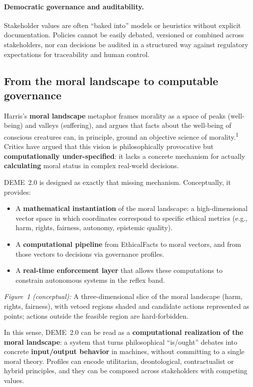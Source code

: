\documentclass[11pt]{article}
\begin{document}
\paragraph{Democratic governance and auditability.}
Stakeholder values are often ``baked into'' models or heuristics without explicit documentation. Policies cannot be easily debated, versioned or combined across stakeholders, nor can decisions be audited in a structured way against regulatory expectations for traceability and human control.

\subsection{From the moral landscape to computable governance}

Harris's \textbf{moral landscape} metaphor frames morality as a space of peaks (well-being) and valleys (suffering), and argues that facts about the well-being of conscious creatures can, in principle, ground an objective science of morality.\textsuperscript{1} Critics have argued that this vision is philosophically provocative but \textbf{computationally under-specified}: it lacks a concrete mechanism for actually \textbf{calculating} moral status in complex real-world decisions.

DEME~2.0 is designed as exactly that missing mechanism. Conceptually, it provides:

\begin{itemize}
  \item A \textbf{mathematical instantiation} of the moral landscape: a high-dimensional vector space in which coordinates correspond to specific ethical metrics (e.g., harm, rights, fairness, autonomy, epistemic quality).
  \item A \textbf{computational pipeline} from EthicalFacts to moral vectors, and from those vectors to decisions via governance profiles.
  \item A \textbf{real-time enforcement layer} that allows these computations to constrain autonomous systems in the reflex band.
\end{itemize}

\medskip
\noindent\emph{Figure~1 (conceptual):} A three-dimensional slice of the moral landscape (harm, rights, fairness), with vetoed regions shaded and candidate actions represented as points; actions outside the feasible region are hard-forbidden.

\medskip
In this sense, DEME~2.0 can be read as a \textbf{computational realization of the moral landscape}: a system that turns philosophical ``is/ought'' debates into concrete \textbf{input/output behavior} in machines, without committing to a single moral theory. Profiles can encode utilitarian, deontological, contractualist or hybrid principles, and they can be composed across stakeholders with competing values.
\end{document}

